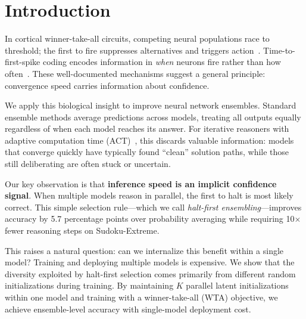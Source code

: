 \section{Introduction}

In cortical winner-take-all circuits, competing neural populations race to
threshold; the first to fire suppresses alternatives and triggers
action~\citep{grossberg1987competitive}. Time-to-first-spike coding encodes
information in \emph{when} neurons fire rather than how
often~\citep{thorpe2001spike}. These well-documented mechanisms suggest a
general principle: convergence speed carries information about confidence.

We apply this biological insight to improve neural network ensembles. Standard
ensemble methods average predictions across models, treating all outputs
equally regardless of when each model reaches its answer. For iterative
reasoners with adaptive computation time (ACT)~\citep{graves2016act}, this
discards valuable information: models that converge quickly have typically
found ``clean'' solution paths, while those still deliberating are often stuck
or uncertain.

Our key observation is that \textbf{inference speed is an implicit confidence
signal}. When multiple models reason in parallel, the first to halt is most
likely correct. This simple selection rule---which we call \emph{halt-first
ensembling}---improves accuracy by 5.7 percentage points over probability
averaging while requiring 10$\times$ fewer reasoning steps on Sudoku-Extreme.

This raises a natural question: can we internalize this benefit within a single
model? Training and deploying multiple models is expensive. We show that the
diversity exploited by halt-first selection comes primarily from different
random initializations during training. By maintaining $K$ parallel latent
initializations within one model and training with a winner-take-all (WTA)
objective, we achieve ensemble-level accuracy with single-model deployment
cost.

